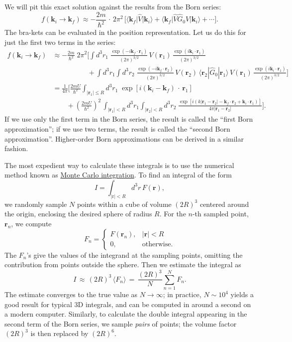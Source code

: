 \documentclass[pra,12pt]{revtex4}
\begin{document}
We will pit this exact solution against the results from the Born
series:
$$f(\mathbf{k}_i\rightarrow \mathbf{k}_f) \approx - \frac{2m}{\hbar^2} \,\cdot \, 2\pi^2 \, \Bigg[\big\langle \mathbf{k}_f\big| \hat{V}|\mathbf{k}_i\big\rangle + \big\langle \mathbf{k}_f \big| \hat{V}\hat{G}_0 \hat{V} \big|\mathbf{k}_i\big\rangle + \cdots \Bigg].$$
The bra-kets can be evaluated in the position representation.  Let us
do this for just the first two terms in the series:
$$\begin{aligned}f(\mathbf{k}_i\rightarrow \mathbf{k}_f) &\approx - \frac{2m}{\hbar^2} \; 2\pi^2 \Bigg[\int d^3r_1\; \frac{\exp(-i\mathbf{k}_f \cdot \mathbf{r}_1)}{(2\pi)^{3/2}} \, V(\mathbf{r}_1) \, \frac{\exp(i\mathbf{k}_i \cdot \mathbf{r}_1)}{(2\pi)^{3/2}} \\&\qquad\qquad\quad + \int d^3r_1 \!\! \int d^3r_2 \; \frac{\exp(-i\mathbf{k}_f \cdot \mathbf{r}_2)}{(2\pi)^{3/2}} \, V(\mathbf{r}_2) \, \langle\mathbf{r}_2|\hat{G}_0|\mathbf{r}_1 \rangle \, V(\mathbf{r}_1)\, \frac{\exp(i\mathbf{k}_i \cdot \mathbf{r}_1)}{(2\pi)^{3/2}}\Bigg] \\ &= \frac{1}{4\pi} \Bigg[\frac{2mU}{\hbar^2} \int_{|\mathbf{r}_1| \le R} d^3r_1 \; \exp\left[i(\mathbf{k}_i-\mathbf{k}_f)\, \cdot\, \mathbf{r}_1\right] \\ &\qquad + \left(\frac{2mU}{\hbar^2}\right)^2\, \int_{|\mathbf{r}_1|<R} d^3 r_1 \int_{|\mathbf{r}_2|<R} d^3 r_2 \; \frac{\exp\left[i(k|\mathbf{r}_1-\mathbf{r}_2| - \mathbf{k}_f \cdot \mathbf{r}_2 +\mathbf{k}_i \cdot \mathbf{r}_1)\right]}{4\pi|\mathbf{r}_1-\mathbf{r}_2|} \Bigg]. \end{aligned}$$
If we use only the first term in the Born series, the result is
called the ``first Born approximation''; if we use two terms, the
result is called the ``second Born approximation''.  Higher-order Born
approximations can be derived in a similar fashion.

The most expedient way to calculate these integrals is to use the
numerical method known as
\href{https://en.wikipedia.org/wiki/Monte_Carlo_integration}{Monte
  Carlo integration}.  To find an integral of the form
$$I = \int_{|\mathrm{r}|<R} d^3r \, F(\mathbf{r}),$$
we randomly sample $N$ points within a cube of volume $(2R)^3$
centered around the origin, enclosing the desired sphere of radius
$R$.  For the $n$-th sampled point, $\mathbf{r}_n$, we compute
$$F_n = \begin{cases}F(\mathbf{r}_n), & |\mathbf{r}| < R \\ 0, &\mathrm{otherwise}.\end{cases}$$
The $F_n$'s give the values of the integrand at the sampling points,
omitting the contribution from points outside the sphere.  Then we
estimate the integral as
$$I \,\approx\, (2R)^3 \, \langle F_n\rangle \,=\, \frac{(2R)^3}{N} \sum_{n=1}^N F_n.$$
The estimate converges to the true value as $N\rightarrow\infty$; in
practice, $N \sim 10^4$ yields a good result for typical 3D integrals,
and can be computed in around a second on a modern computer.
Similarly, to calculate the double integral appearing in the second
term of the Born series, we sample \textit{pairs} of points; the
volume factor $(2R)^3$ is then replaced by $(2R)^6$.
\end{document}
